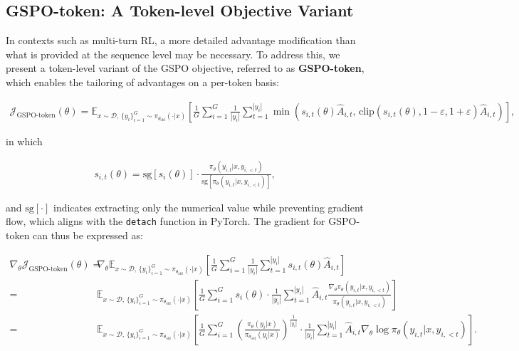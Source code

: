 \subsection{GSPO-token: A Token-level Objective Variant}

In contexts such as multi-turn RL, a more detailed advantage modification than what is provided at the sequence level may be necessary. To address this, we present a token-level variant of the GSPO objective, referred to as \textbf{GSPO-token}, which enables the tailoring of advantages on a per-token basis:

\begin{align}
\mathcal{J}_\text{GSPO-token}(\theta)
=
\mathbb{E}_{ x \sim \mathcal{D},\, \{y_i\}_{i=1}^G \sim \pi_{\theta_\text{old}}( \cdot | x) }
\left[ 
\frac{1}{G} \sum_{i=1}^{G} \frac{1}{|y_i|} \sum_{t=1}^{|y_i|} 
\min \left( s_{i,t}(\theta) \widehat{A}_{i,t},  \, \mathrm{clip} \left( s_{i,t}(\theta), 1 - {\varepsilon}, 1 + {\varepsilon} \right) \widehat{A}_{i,t} \right) 
\right],
\label{equ:gspo-token}
\end{align}

in which

\begin{align}
s_{i,t}(\theta) 
= \mathrm{sg} \left[ s_{i}(\theta) \right]  \cdot \frac{ \pi_{\theta} (y_{i,t} | x, y_{i,<t}) }{ \mathrm{sg} \left[ \pi_{\theta} (y_{i,t} | x, y_{i,<t}) \right] },
\end{align}

and $\mathrm{sg}[\cdot]$ indicates extracting only the numerical value while preventing gradient flow, which aligns with the \texttt{detach} function in PyTorch. The gradient for GSPO-token can thus be expressed as:

\begin{align}
\nabla_{\theta} \mathcal{J}_\text{GSPO-token}(\theta)
=&\ 
\nabla_{\theta} \mathbb{E}_{ x \sim \mathcal{D},\, \{y_i\}_{i=1}^G \sim \pi_{\theta_\text{old}}( \cdot | x) }
\left[ 
\frac{1}{G} \sum_{i=1}^{G}
\frac{1}{|y_i|} \sum_{t=1}^{|y_i|} 
s_{i,t}(\theta) \widehat{A}_{i,t}
\right] \\
=&\ 
\mathbb{E}_{ x \sim \mathcal{D},\, \{y_i\}_{i=1}^G \sim \pi_{\theta_\text{old}}( \cdot | x) }
\left[ 
\frac{1}{G} \sum_{i=1}^{G} s_i (\theta) \cdot \frac{1}{|y_i|} \sum_{t=1}^{|y_i|} 
\widehat{A}_{i,t} \frac{ \nabla_{\theta} \pi_{\theta} (y_{i,t} | x, y_{i,<t}) }{ \pi_{\theta} (y_{i,t} | x, y_{i,<t}) }
\right] \\
=&\ 
\mathbb{E}_{ x \sim \mathcal{D},\, \{y_i\}_{i=1}^G \sim \pi_{\theta_\text{old}}( \cdot | x) }
\left[ 
\frac{1}{G} \sum_{i=1}^{G}  \left( \frac{ \pi_{\theta} (y_i | x) }{ \pi_{\theta_\text{old}} (y_i | x)} \right)^{\frac{1}{|y_i|}}
\cdot \frac{1}{|y_i|} \sum_{t=1}^{|y_i|}
\widehat{A}_{i,t} \nabla_{\theta} \log \pi_{\theta} (y_{i,t} | x, y_{i,<t})  
\right].
\label{equ:gspo-token_grad}
\end{align}

